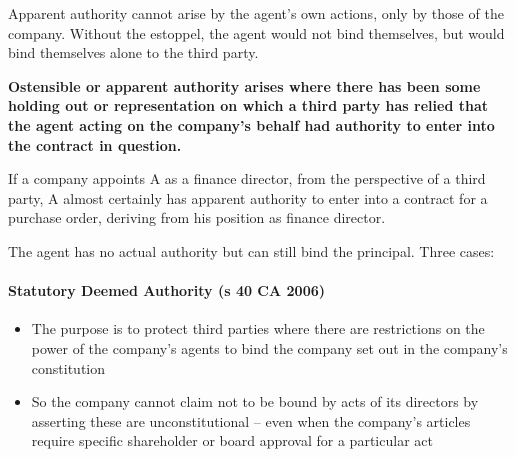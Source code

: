\documentclass[
]{article}
\newenvironment{Shaded}{}{}
\newcommand{\NormalTok}[1]{#1}
\providecommand{\tightlist}{%
  \setlength{\itemsep}{0pt}\setlength{\parskip}{0pt}}
\begin{document}
Apparent authority cannot arise by the agent's own actions, only by
those of the company. Without the estoppel, the agent would not bind
themselves, but would bind themselves alone to the third party.

\textbf{Ostensible or apparent authority arises where there has been
some holding out or representation on which a third party has relied
that the agent acting on the company's behalf had authority to enter
into the contract in question.}

\begin{Shaded}
\begin{Highlighting}[]
\NormalTok{If a company appoints A as a finance director, from the perspective of a third party, A almost certainly has apparent authority to enter into a contract for a purchase order, deriving from his position as finance director.}
\end{Highlighting}
\end{Shaded}

The agent has no actual authority but can still bind the principal.
Three cases:

\hypertarget{statutory-deemed-authority-s-40-ca-2006}{%
\paragraph{Statutory Deemed Authority (s 40 CA
2006)}\label{statutory-deemed-authority-s-40-ca-2006}}

\begin{itemize}
\tightlist
\item
  The purpose is to protect third parties where there are restrictions
  on the power of the company's agents to bind the company set out in
  the company's constitution
\item
  So the company cannot claim not to be bound by acts of its directors
  by asserting these are unconstitutional -- even when the company's
  articles require specific shareholder or board approval for a
  particular act
\end{itemize}
\end{document}

